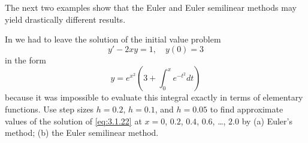The next two examples show that the Euler and Euler semilinear
methods may yield drastically different results.

\begin{example}\label{example:3.1.4}
In  we had to leave the solution of the initial
value
problem
\begin{equation} \label{eq:3.1.22}
y'-2xy=1,\quad y(0)=3
\end{equation}
in the  form
\begin{equation} \label{eq:3.1.23}
y=e^{x^2}\left(3 +\int^x_0 e^{-t^2}dt\right)
\end{equation}
because it was impossible to evaluate this integral exactly in terms
of elementary functions.
Use step sizes $h=0.2$, $h=0.1$, and $h=0.05$ to find approximate
values
of the solution of \eqref{eq:3.1.22} at $x=0$, $0.2$, $0.4$, $0.6$,
\dots, $2.0$ by
(a) Euler's method; (b) the Euler semilinear method.
\end{example}


